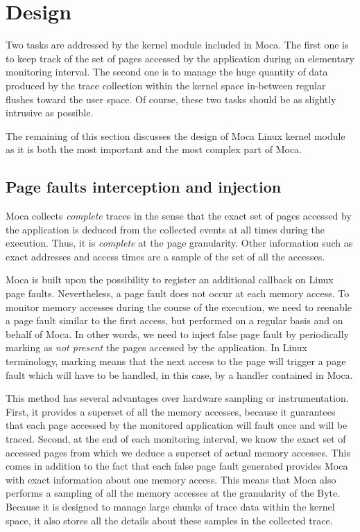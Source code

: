 \section{Design}
\label{sec:moca-design}

Two tasks are addressed by the kernel module included in \gls{Moca}.
The first one is to keep track of the set of pages accessed by the application during an elementary monitoring interval.
The second one is to manage the huge quantity of data produced by the trace collection within the kernel space in-between regular flushes toward the user space.
Of course, these two tasks should be as slightly intrusive as possible.

The remaining of this section discusses the design of \gls{Moca} \gls{Linux} kernel module as it is both the most important and the most complex part of \gls{Moca}.

\subsection{Page faults interception and injection}

\gls{Moca} collects \emph{complete} traces in the sense that the exact set of pages accessed by the application is deduced from the collected events at all times during the execution.
Thus, it is \emph{complete} at the page granularity.
Other information such as exact addresses and access times are a sample of the set of all the accesses.

\gls{Moca} is built upon the possibility to register an additional callback on Linux page faults.
Nevertheless, a page fault does not occur at each memory access.
To monitor memory accesses during the course of the execution, we need to reenable a page fault similar to the first access, but performed on a regular basis and on behalf of \gls{Moca}.
In other words, we need to inject false page fault by periodically marking as \emph{not present} the pages accessed by the application.
In Linux terminology, marking means that the next access to the page will trigger a page fault which will have to be handled, in this case, by a handler contained in \gls{Moca}.

This method has several advantages over hardware sampling or instrumentation.
First, it provides a superset of all the memory accesses, because it guarantees that each page accessed by the monitored application will fault once and will be traced.
Second, at the end of each monitoring interval, we know the exact set of accessed pages from which we deduce a superset of actual memory accesses.
This comes in addition to the fact that each false page fault generated provides \gls{Moca} with exact information about one memory access.
This means that \gls{Moca} also performs a sampling of all the memory accesses at the granularity of the Byte.
Because it is designed to manage large chunks of trace data within the kernel space, it also stores all the details about these samples in the collected trace.

